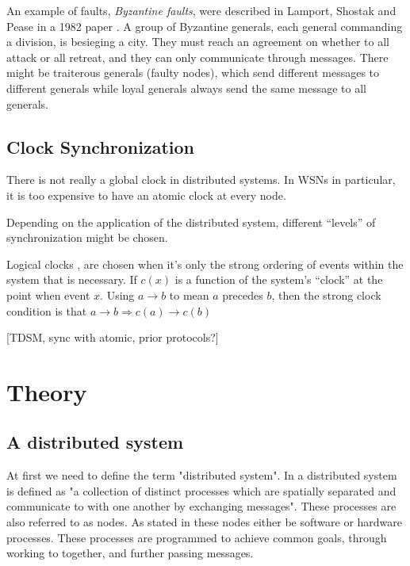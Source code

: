 \documentclass[a4paper,12pt]{article}
\begin{document}
An example of faults, \textit{Byzantine faults}, were described in
Lamport, Shostak and Pease in a 1982 paper \cite{Lamport82}.  A group
of Byzantine generals, each general commanding a division, is
besieging a city.  They must reach an agreement on whether to all
attack or all retreat, and they can only communicate through messages.
There might be traiterous generals (faulty nodes), which send
different messages to different generals while loyal generals always
send the same message to all generals.

\subsection{Clock Synchronization}

There is not really a global clock in distributed systems.  In WSNs in
particular, it is too expensive to have an atomic clock at every node.

Depending on the application of the distributed system, different
``levels'' of synchronization might be chosen.  

Logical clocks \cite{Lamport78}, are chosen when it's only the strong
ordering of events within the system that is necessary.  If $c(x)$ is
a function of the system's ``clock'' at the point when event $x$.  Using
$a \rightarrow b$ to mean $a$ precedes $b$, then the strong clock condition is that
$a \rightarrow b \Rightarrow c(a) \rightarrow c(b)$

[TDSM, sync with atomic, prior protocols?]

\section{Theory}

\subsection{A distributed system}

At first we need to define the term "distributed system". In \cite{Lamport78} a distributed system is defined as "a collection of distinct processes which are spatially separated and communicate to with one another by exchanging messages". These processes are also referred to as nodes. As stated in \cite{TanenbaumSteen06} these nodes either be software or hardware processes. These processes are programmed to achieve common goals, through working to together, and further passing messages. 


\end{document}
